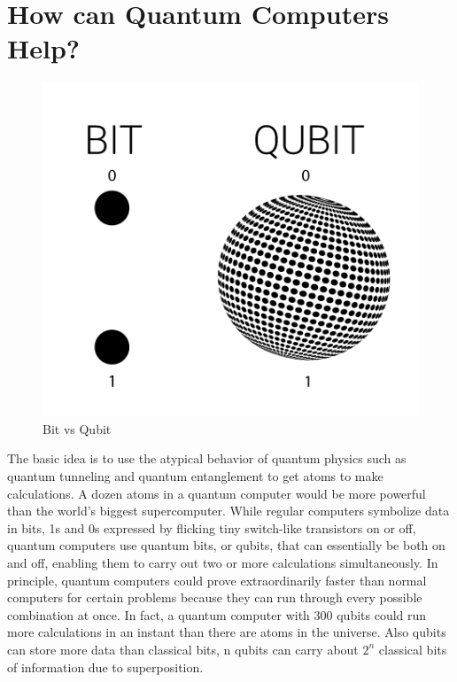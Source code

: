 \section{How can Quantum Computers Help?}
\begin{figure}[H]
\centering\includegraphics[width=.3\textwidth]{images/qubit.png}
\caption{Bit vs Qubit}
\end{figure}
The basic idea is to use the atypical behavior of quantum physics such as quantum tunneling and quantum entanglement to get atoms to make calculations. A dozen atoms in a quantum computer would be more powerful than the world’s biggest supercomputer. While regular computers symbolize data in bits, 1s and 0s expressed by flicking tiny switch-like transistors on or off, quantum computers use quantum bits, or qubits, that can essentially be both on and off, enabling them to carry out two or more calculations simultaneously. In principle, quantum computers could prove extraordinarily faster than normal computers for certain problems because they can run through every possible combination at once. In fact, a quantum computer with 300 qubits could run more calculations in an instant than there are atoms in the universe. Also qubits can store more data than classical bits, n qubits can carry about $2^n$ classical bits of information due to superposition.
